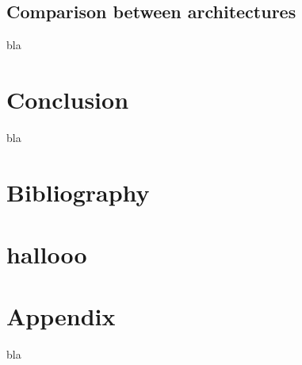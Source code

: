 \documentclass[a4paper,11pt]{article}
\begin{document}
\subsection{Comparison between architectures}
bla
\section{Conclusion}
bla
\section{Bibliography}


\section{hallooo}

\section{Appendix}
bla
\end{document}
